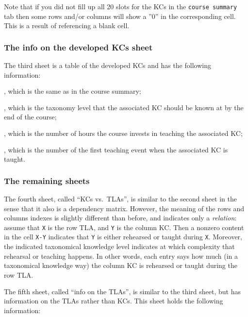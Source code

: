 Note that if you did not fill up all 20 slots for the \acp{KC} in the
\texttt{course summary} tab then some rows and/or columns will show a ''0''
in the corresponding cell. This is a result of referencing a blank cell.


\subsubsection{The info on the developed KCs sheet}

The third sheet is a table of the developed \acp{KC} and has the following
information:

\begin{itemize}

	, which is the same as in the course
		summary;
	
	, which is the taxonomy level that
		the associated \ac{KC} should be known at by the end of the
		course;
	
	, which is the number of hours the
		course invests in teaching the associated \ac{KC};
	
	, which is the number of the first teaching
		event when the associated \ac{KC} is taught.

\end{itemize}


\subsubsection{The remaining sheets}

The fourth sheet, called ``KCs vs.\ TLAs'', is similar to the second sheet
in the sense that it also is a dependency matrix. However, the meaning of
the rows and columns indexes is slightly different than before, and
indicates only a \emph{relation}: assume that \texttt{X} is the row
\ac{TLA}, and \texttt{Y} is the column \ac{KC}. Then a nonzero content in
the cell \texttt{X-Y} indicates that \texttt{Y} is either rehearsed or
taught during \texttt{X}. Moreover, the indicated taxonomical knowledge
level indicates at which complexity that rehearsal or teaching happens. In
other words, each entry says how much (in a taxonomical knowledge way) the
column \ac{KC} is rehearsed or taught during the row \ac{TLA}.

The fifth sheet, called ``info on the TLAs'', is similar to the third sheet,
but has information on the \acp{TLA} rather than \acp{KC}. This sheet holds
the following information:


